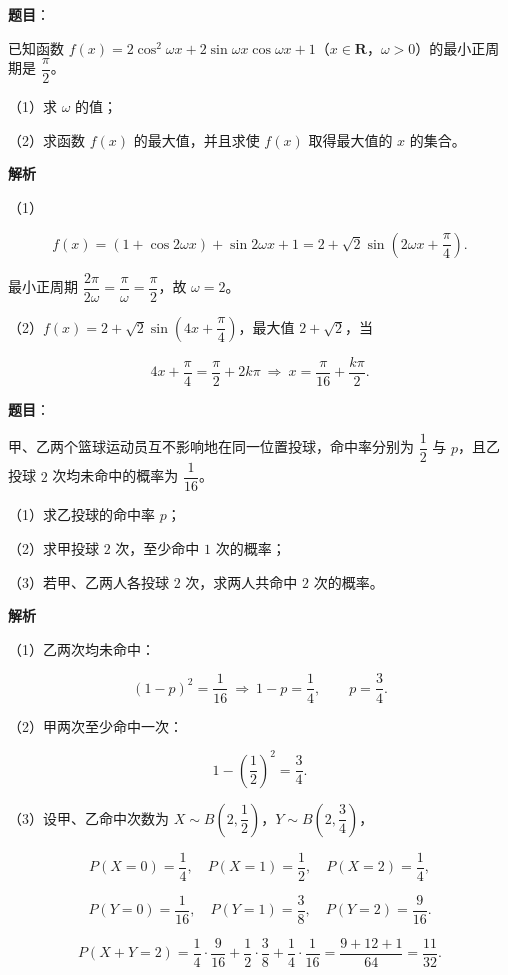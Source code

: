 \begin{answer}

\textbf{题目}：

已知函数 $f(x)=2\cos^2\omega x+2\sin\omega x\cos\omega x+1$（$x\in\mathbf R$，$\omega>0$）的最小正周期是 $\dfrac{\pi}2$。

（1）求 $\omega$ 的值；

（2）求函数 $f(x)$ 的最大值，并且求使 $f(x)$ 取得最大值的 $x$ 的集合。

\textbf{解析}

（1）

\nopagebreak[4]
\[f(x)=(1+\cos2\omega x)+\sin2\omega x+1=2+\sqrt2\sin\left(2\omega x+\frac{\pi}4\right).\]

最小正周期 $\dfrac{2\pi}{2\omega}=\dfrac{\pi}\omega=\dfrac{\pi}2$，故 $\omega=2$。

（2）$f(x)=2+\sqrt2\sin\left(4x+\dfrac{\pi}4\right)$，最大值 $2+\sqrt2$，当

\nopagebreak[4]
\[4x+\frac{\pi}4=\frac{\pi}2+2k\pi\ \Longrightarrow\ x=\frac{\pi}{16}+\frac{k\pi}2.\]


\end{answer}
\begin{answer}

\textbf{题目}：

甲、乙两个篮球运动员互不影响地在同一位置投球，命中率分别为 $\dfrac12$ 与 $p$，且乙投球 $2$ 次均未命中的概率为 $\dfrac1{16}$。

（1）求乙投球的命中率 $p$；

（2）求甲投球 $2$ 次，至少命中 $1$ 次的概率；

（3）若甲、乙两人各投球 $2$ 次，求两人共命中 $2$ 次的概率。

\textbf{解析}

（1）乙两次均未命中：

\nopagebreak[4]
\[(1-p)^2=\frac1{16}\ \Longrightarrow\ 1-p=\frac14,\qquad p=\frac34.\]

（2）甲两次至少命中一次：

\nopagebreak[4]
\[1-\left(\frac12\right)^2=\frac34.\]

（3）设甲、乙命中次数为 $X\sim B\left(2,\dfrac12\right)$，$Y\sim B\left(2,\dfrac34\right)$，

\nopagebreak[4]
\[P(X=0)=\frac14,\quad P(X=1)=\frac12,\quad P(X=2)=\frac14,\]

\nopagebreak[4]
\[P(Y=0)=\frac1{16},\quad P(Y=1)=\frac38,\quad P(Y=2)=\frac9{16}.\]

\nopagebreak[4]
\[P(X+Y=2)=\frac14\cdot\frac9{16}+\frac12\cdot\frac38+\frac14\cdot\frac1{16}
=\frac{9+12+1}{64}=\frac{11}{32}.\]


\end{answer}
